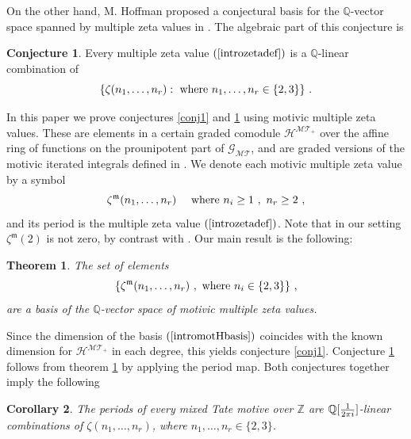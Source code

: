 \documentclass[10pt]{amsart}
\newtheorem{thm}{Theorem}[section]
\newtheorem{cor}[thm]{Corollary}
\theoremstyle{definition}
\newtheorem{conj}{Conjecture}
\theoremstyle{remark}
\numberwithin{equation}{section}
\newcommand{\Z}{\mathbb Z}
\newcommand{\Homt}{\mathcal{H^{MT_+}}}
\newcommand{\GMT}{\mathcal{G_{MT}}}
\newcommand{\zetam}{\zeta^{ \mathfrak{m}}}
\newcommand{\Q}{\mathbb Q}
\begin{document}
On the other hand, M. Hoffman proposed a  conjectural basis for the $\Q$-vector space spanned by multiple zeta values in \cite{Hoffman}.  The algebraic part of this conjecture is
\begin{conj} \label{conj2} Every multiple zeta value $(\ref{introzetadef})$ is a $\Q$-linear combination of 
\begin{equation}\label{Hbasis} \{\zeta(n_1,\ldots, n_r): \hbox{ where } n_1,\ldots, n_r \in \{2,3\}\} \ .
\end{equation}
\end{conj}
In this paper we prove conjectures \ref{conj1} and \ref{conj2} using  motivic multiple zeta values. These are  elements in 
a certain graded comodule $\Homt$ over the affine ring   of functions on the prounipotent part of $\GMT$,  and are graded versions of the motivic iterated integrals
defined in \cite{GG}. We  denote each motivic multiple zeta  value by a symbol 
\begin{equation}\label{introzmot}
\zetam(n_1,\ldots, n_r) \quad  \hbox{ where }   n_i \geq 1 \ , \ n_r \geq 2 \ ,
\end{equation}
and its period  is the  multiple zeta value $(\ref{introzetadef})$.
 Note that in our setting $\zetam(2)$ is not zero, by contrast with \cite{GG}.
Our main result is the following:
\begin{thm} \label{intromaintheorem}  The set of elements 
\begin{equation} \label{intromotHbasis} \{\zetam(n_1,\ldots, n_r)\ , \hbox{ where  } n_i\in \{2,3\}\}\ ,
\end{equation} 
 are a basis of the  $\Q$-vector space  of  motivic multiple zeta values.\end{thm}
Since the dimension of the basis $(\ref{intromotHbasis})$ coincides with the known dimension for  $\Homt$ in each  degree,
 this  yields  conjecture \ref{conj1}. Conjecture \ref{conj2} follows  from theorem \ref{intromaintheorem} by applying the period map. Both conjectures together imply the following



\begin{cor} The periods of every mixed Tate motive over $\Z$ are $\Q[{1\over 2 \pi i}]$-linear combinations of 
$\zeta(n_1,\ldots, n_r)$,  where $n_1,\ldots, n_r\in \{2,3\}$.
\end{cor}
\end{document}
